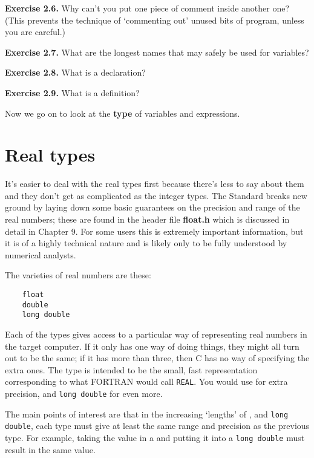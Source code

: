    \textbf{Exercise 2.6.} Why can't you put one piece of comment inside another
    one? (This prevents the technique of `commenting out' unused bits of
    program, unless you are careful.)


   \textbf{Exercise 2.7.} What are the longest names that may safely be used for
    variables?


   \textbf{Exercise 2.8.} What is a declaration?


   \textbf{Exercise 2.9.} What is a definition?


  

  Now we go on to look at the \textbf{type} of variables and
   expressions.


 
        \section{Real types}
        

  

  It's easier to deal with the real types first because there's less to say
   about them and they don't get as complicated as the integer types. The
   Standard breaks new ground by laying down some basic guarantees on the
   precision and range of the real numbers; these are found in the header file
   \textbf{float.h} which is discussed in detail in Chapter 9.
   For some users this is extremely important information, but it is of a
   highly technical nature and is likely only to be fully understood by
   numerical analysts.


  The varieties of real numbers are these:


  \begin{Verbatim}
    float
    double
    long double
  \end{Verbatim}

  Each of the types gives access to a particular way of representing real
  numbers in the target computer. If it only has one way of doing things,
  they might all turn out to be the same; if it has more than three, then C
  has no way of specifying the extra ones. The type \float{} is
  intended to be the small, fast representation corresponding to what FORTRAN
  would call \texttt{REAL}. You would use \double{} for extra
  precision, and \texttt{long double} for even more.


  The main points of interest are that in the increasing `lengths' of
   \float, \double{} and \texttt{long double}, each
   type must give at least the same range and precision as the previous type.
   For example, taking the value in a \double{} and putting it into
   a \texttt{long double} must result in the same value.


